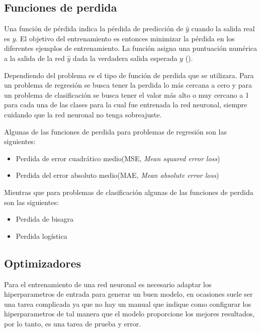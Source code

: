 \subsection{Funciones de perdida}

Una función de pérdida indica la pérdida de predicción de $\hat{y}$ cuando la salida real es $y$. El objetivo del entrenamiento es entonces minimizar la pérdida en los diferentes ejemplos de entrenamiento. La función asigna una puntuación numérica a la salida de la red $\hat{y}$ dada la verdadera salida esperada $y$ (\cite{goldberg2017Neural}).

Dependiendo del problema es el tipo de función de perdida que se utilizara. Para un problema de regresión se busca tener la perdida lo más cercana a cero y para un problema de clasificación se busca tener el valor más alto o muy cercano a 1 para cada una de las clases para la cual fue entrenada la red neuronal, siempre cuidando que la red neuronal no tenga sobreajuste.

Algunas de las funciones de perdida para problemas de  regresión son las siguientes:

\begin{itemize}
    \item Perdida de error cuadrático medio(MSE, \textit{Mean squared error loss})
    \item Perdida del error absoluto medio(MAE, \textit{Mean absolute error loss})
\end{itemize}

Mientras que para problemas de clasificación algunas de las funciones de perdida son las siguientes:

\begin{itemize}
    \item Perdida de bisagra
    \item Perdida logística
\end{itemize}

\subsection{Optimizadores}

Para el entrenamiento de una red neuronal es necesario adaptar los hiperparametros de entrada para generar un buen modelo, en ocasiones suele ser una tarea complicada ya que no hay un manual que indique como configurar los hiperparametros de tal manera que el modelo proporcione los mejores resultados, por lo tanto, es una tarea de prueba y error.


